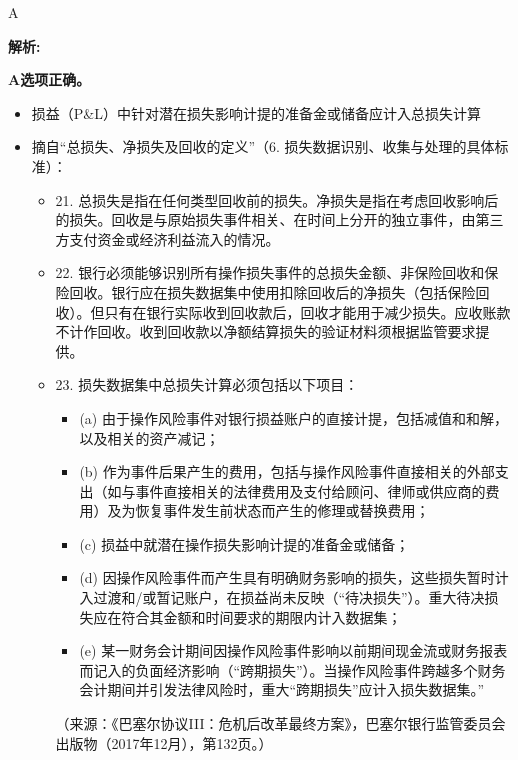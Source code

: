 \documentclass{article}
\newenvironment{explanation}
{\textbf{解析:}\par}
{\par}
\begin{document}
\begin{correctanswer}
    A
\end{correctanswer}

\begin{explanation}
    \textbf{A选项正确。} 
    \begin{itemize}
        \item 损益（P\&L）中针对潜在损失影响计提的准备金或储备应计入总损失计算
        \item  摘自“总损失、净损失及回收的定义”（6. 损失数据识别、收集与处理的具体标准）：
        \begin{itemize}
       
        \item 21. 总损失是指在任何类型回收前的损失。净损失是指在考虑回收影响后的损失。回收是与原始损失事件相关、在时间上分开的独立事件，由第三方支付资金或经济利益流入的情况。
        
        \item 22. 银行必须能够识别所有操作损失事件的总损失金额、非保险回收和保险回收。银行应在损失数据集中使用扣除回收后的净损失（包括保险回收）。但只有在银行实际收到回收款后，回收才能用于减少损失。应收账款不计作回收。收到回收款以净额结算损失的验证材料须根据监管要求提供。
        
        \item 23. 损失数据集中总损失计算必须包括以下项目：
        \begin{itemize}
        \item (a) 由于操作风险事件对银行损益账户的直接计提，包括减值和和解，以及相关的资产减记；
        
        \item (b) 作为事件后果产生的费用，包括与操作风险事件直接相关的外部支出（如与事件直接相关的法律费用及支付给顾问、律师或供应商的费用）及为恢复事件发生前状态而产生的修理或替换费用；
        
        \item (c) 损益中就潜在操作损失影响计提的准备金或储备；
        
        \item (d) 因操作风险事件而产生具有明确财务影响的损失，这些损失暂时计入过渡和/或暂记账户，在损益尚未反映（“待决损失”）。重大待决损失应在符合其金额和时间要求的期限内计入数据集；
        
        \item (e) 某一财务会计期间因操作风险事件影响以前期间现金流或财务报表而记入的负面经济影响（“跨期损失”）。当操作风险事件跨越多个财务会计期间并引发法律风险时，重大“跨期损失”应计入损失数据集。”
        \end{itemize}
        （来源：《巴塞尔协议III：危机后改革最终方案》，巴塞尔银行监管委员会出版物（2017年12月），第132页。）
        \end{itemize}
    \end{itemize}
    

\end{explanation}
\end{document}
